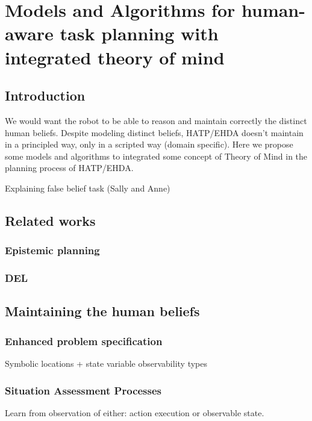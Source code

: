 \ifdefined{}
\else
\setcounter{chapter}{2} %
\dominitoc
\faketableofcontents
\fi

\chapter{Models and Algorithms for human-aware task planning with integrated theory of mind}
\label{chap:3}
\minitoc


\section{Introduction}

We would want the robot to be able to reason and maintain correctly the distinct human beliefs. Despite modeling distinct beliefs, HATP/EHDA doesn't maintain in a principled way, only in a scripted way (domain specific). Here we propose some models and algorithms to integrated some concept of Theory of Mind in the planning process of HATP/EHDA. 

Explaining false belief task (Sally and Anne)

\section{Related works}
\subsection{Epistemic planning}
\subsection{DEL}

\section{Maintaining the human beliefs}

\subsection{Enhanced problem specification}
Symbolic locations + state variable observability types

\subsection{Situation Assessment Processes}
Learn from observation of either: action execution or observable state.

